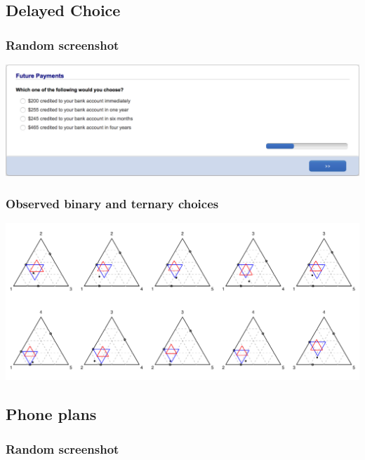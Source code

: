 \documentclass[11pt,letter]{article}
\begin{document}
\pagebreak

\subsection*{Delayed Choice}



\subsubsection*{Random screenshot}

\includegraphics[width=15cm]{Population_study_design/screenshot_Future_Payments.png}

\subsubsection*{Observed binary and ternary choices}

\includegraphics[width=15cm]{./Population_study_data/Simplexes/Future_payments.pdf}

\pagebreak

\subsection*{Phone plans}



\subsubsection*{Random screenshot}
\end{document}
